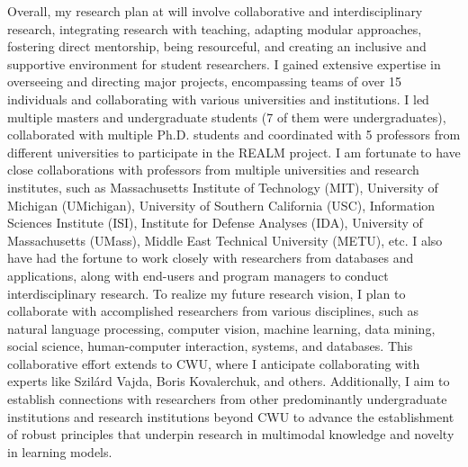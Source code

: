 Overall, my research plan at \shortInstitutionName{}
will involve collaborative and interdisciplinary research, integrating research with teaching, adapting modular approaches, fostering direct mentorship, being resourceful, and creating an inclusive and supportive environment for student researchers.
%
%
%
I gained extensive expertise in overseeing and directing major projects, encompassing teams of over 15 individuals and collaborating with various universities and institutions.
I led multiple masters and undergraduate students (7 of them were undergraduates), collaborated with multiple Ph.D. students and coordinated with 5 professors from different universities to participate in the REALM project. I am fortunate to have close collaborations with professors from multiple universities and research institutes, such as Massachusetts Institute of Technology (MIT), University of Michigan (UMichigan), University of Southern California (USC), Information Sciences Institute (ISI), Institute for Defense Analyses (IDA), University of Massachusetts (UMass), Middle East Technical University (METU), etc. I also have had the fortune to work closely with researchers from databases and applications, along with end-users and program managers to conduct interdisciplinary research. 
%
To realize my future research vision, I plan to collaborate with accomplished researchers from various disciplines, such as natural language processing, computer vision, machine learning, data mining, social science, human-computer interaction, systems, and databases. This collaborative effort extends to CWU, where I anticipate collaborating with experts like Szilárd Vajda, Boris Kovalerchuk, and others. 
Additionally, I aim to establish connections with researchers from other predominantly undergraduate institutions and research institutions beyond CWU to advance the establishment of robust principles that underpin research in multimodal knowledge and novelty in learning models. 


